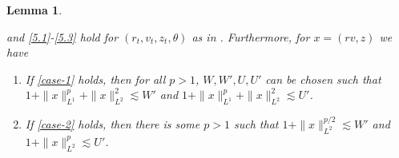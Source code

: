 \documentclass[final]{amsart}
\newtheorem{lem}[thm]{Lemma}
\numberwithin{thm}{section}
\numberwithin{equation}{section}
\begin{document}
\begin{lem}\label{lem:lyapunov-fxn-construction-spde}
    
     and \ref{5.1}-\ref{5.3} hold for $(r_t,v_t,z_t,\theta)$ as in .
    Furthermore, for $x = (rv, z)$ we have 
    \begin{enumerate}[label=(\roman*)]
        \item If \ref{case-1} holds, then for all $p > 1$, $W, W', U, U'$ can be chosen such that  $1+\|x\|_{L^1}^p + \|x\|_{L^2}^2 \lesssim W'$ and $1+\|x\|_{L^1}^p + \|x\|_{L^2}^2 \lesssim U'$.
        \item If \ref{case-2} holds, then there is some $p > 1$ such that $1+\|x\|_{L^2}^{p/2} \lesssim W'$ and $1+\|x\|_{L^2}^p \lesssim U'$.
    \end{enumerate}
\end{lem}
\end{document}
